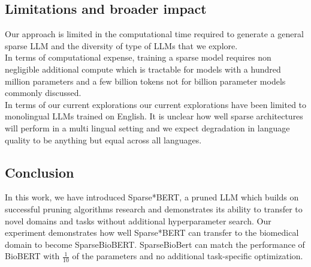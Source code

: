 \begin{table}[htb!]
    \centering
    \caption{Model accuracy as measured by F1 on dev portion of SQUAD compared to model type and the impact of training data size. Sparse models are not as sample efficient as their dense counterparts, but Sparse*BERT performance matches the dense model much more than the model pruned downstream.}
    \label{tab:squad_dataset}
    \vspace{-1.2em}
\end{table}
\subsection{Limitations and broader impact}
Our approach is limited in the computational time required to generate a general sparse LLM and the diversity of type of LLMs that we explore. \\
In terms of computational expense, training a sparse model requires non negligible additional compute which is tractable for models with a hundred million parameters and a few billion tokens not for billion parameter models commonly discussed. \\
In terms of our current explorations our current explorations have been limited to monolingual LLMs trained on English. It is unclear how well sparse architectures will perform in a multi lingual setting and we expect degradation in language quality to be anything but equal across all languages. \\
\subsection{Conclusion}
In this work, we have introduced Sparse*BERT, a pruned LLM which builds on successful pruning algorithms research and demonstrates its ability to transfer to novel domains and tasks without additional hyperparameter search. Our experiment demonstrates how well Sparse*BERT can transfer to the biomedical domain to become SparseBioBERT. SparseBioBert can match the performance of BioBERT with $\frac{1}{10}$ of the parameters and no additional task-specific optimization. 
